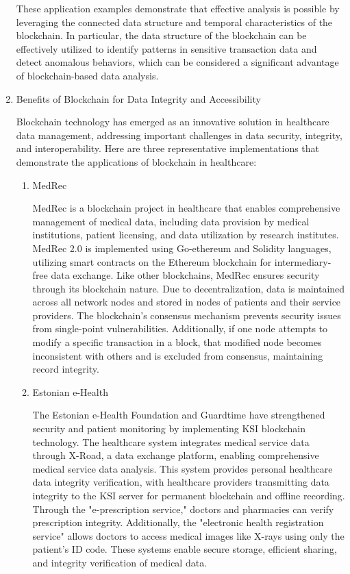 \documentclass[conference]{IEEEtran}
\begin{document}
\begin{enumerate}[itemsep=2ex, parsep=1ex]
			These application examples demonstrate that effective analysis is possible by leveraging the connected data structure and temporal characteristics of the blockchain. In particular, the data structure of the blockchain can be effectively utilized to identify patterns in sensitive transaction data and detect anomalous behaviors, which can be considered a significant advantage of blockchain-based data analysis.

		\item Benefits of Blockchain for Data Integrity and Accessibility

			Blockchain technology has emerged as an innovative solution in healthcare data management, addressing important challenges in data security, integrity, and interoperability. Here are three representative implementations that demonstrate the applications of blockchain in healthcare:

			\begin{enumerate}[itemsep=2ex, parsep=1ex]
				\item MedRec

					MedRec is a blockchain project in healthcare that enables comprehensive management of medical data, including data provision by medical institutions, patient licensing, and data utilization by research institutes. MedRec 2.0 is implemented using Go-ethereum and Solidity languages, utilizing smart contracts on the Ethereum blockchain for intermediary-free data exchange. Like other blockchains, MedRec ensures security through its blockchain nature. Due to decentralization, data is maintained across all network nodes and stored in nodes of patients and their service providers. The blockchain's consensus mechanism prevents security issues from single-point vulnerabilities. Additionally, if one node attempts to modify a specific transaction in a block, that modified node becomes inconsistent with others and is excluded from consensus, maintaining record integrity.

				\item Estonian e-Health

					The Estonian e-Health Foundation and Guardtime have strengthened security and patient monitoring by implementing KSI blockchain technology. The healthcare system integrates medical service data through X-Road, a data exchange platform, enabling comprehensive medical service data analysis. This system provides personal healthcare data integrity verification, with healthcare providers transmitting data integrity to the KSI server for permanent blockchain and offline recording. Through the "e-prescription service," doctors and pharmacies can verify prescription integrity. Additionally, the "electronic health registration service" allows doctors to access medical images like X-rays using only the patient's ID code. These systems enable secure storage, efficient sharing, and integrity verification of medical data.


\end{enumerate}
\end{enumerate}
\end{document}
